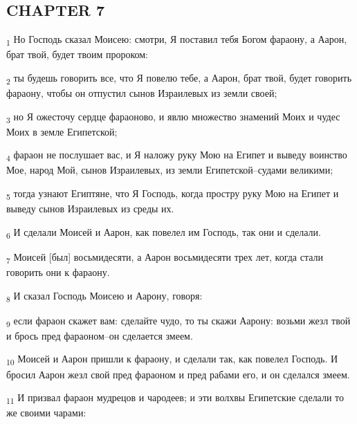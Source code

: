 \subsection{CHAPTER 7}
\begin{tcolorbox}
\textsubscript{1} Но Господь сказал Моисею: смотри, Я поставил тебя Богом фараону, а Аарон, брат твой, будет твоим пророком:
\end{tcolorbox}
\begin{tcolorbox}
\textsubscript{2} ты будешь говорить все, что Я повелю тебе, а Аарон, брат твой, будет говорить фараону, чтобы он отпустил сынов Израилевых из земли своей;
\end{tcolorbox}
\begin{tcolorbox}
\textsubscript{3} но Я ожесточу сердце фараоново, и явлю множество знамений Моих и чудес Моих в земле Египетской;
\end{tcolorbox}
\begin{tcolorbox}
\textsubscript{4} фараон не послушает вас, и Я наложу руку Мою на Египет и выведу воинство Мое, народ Мой, сынов Израилевых, из земли Египетской--судами великими;
\end{tcolorbox}
\begin{tcolorbox}
\textsubscript{5} тогда узнают Египтяне, что Я Господь, когда простру руку Мою на Египет и выведу сынов Израилевых из среды их.
\end{tcolorbox}
\begin{tcolorbox}
\textsubscript{6} И сделали Моисей и Аарон, как повелел им Господь, так они и сделали.
\end{tcolorbox}
\begin{tcolorbox}
\textsubscript{7} Моисей [был] восьмидесяти, а Аарон восьмидесяти трех лет, когда стали говорить они к фараону.
\end{tcolorbox}
\begin{tcolorbox}
\textsubscript{8} И сказал Господь Моисею и Аарону, говоря:
\end{tcolorbox}
\begin{tcolorbox}
\textsubscript{9} если фараон скажет вам: сделайте чудо, то ты скажи Аарону: возьми жезл твой и брось пред фараоном--он сделается змеем.
\end{tcolorbox}
\begin{tcolorbox}
\textsubscript{10} Моисей и Аарон пришли к фараону, и сделали так, как повелел Господь. И бросил Аарон жезл свой пред фараоном и пред рабами его, и он сделался змеем.
\end{tcolorbox}
\begin{tcolorbox}
\textsubscript{11} И призвал фараон мудрецов и чародеев; и эти волхвы Египетские сделали то же своими чарами:
\end{tcolorbox}
